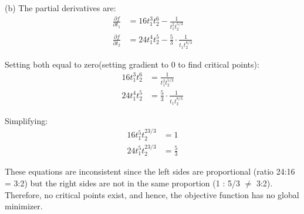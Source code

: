 \documentclass{article}
\begin{document}
(b) The partial derivatives are:
\begin{align*}
\frac{\partial f}{\partial t_1} &= 16t_1^3 t_2^6 - \frac{1}{t_1^2 t_2^{5/3}} \\
\frac{\partial f}{\partial t_2} &= 24t_1^4 t_2^5 - \frac{5}{3} \cdot \frac{1}{t_1 t_2^{8/3}}
\end{align*}

Setting both equal to zero(setting gradient to 0 to find critical points):
\begin{align*}
16t_1^3 t_2^6 &= \frac{1}{t_1^2 t_2^{5/3}} \\
24t_1^4 t_2^5 &= \frac{5}{3} \cdot \frac{1}{t_1 t_2^{8/3}}
\end{align*}

Simplifying:
\begin{align*}
16t_1^5 t_2^{23/3} &= 1 \\
24t_1^5 t_2^{23/3} &= \frac{5}{3}
\end{align*}

These equations are inconsistent since the left sides are proportional (ratio 24:16 = 3:2) but the right sides are not in the same proportion (1 : 5/3 $\neq$ 3:2). \\

Therefore, no critical points exist, and hence, the objective function has no global minimizer.
\end{document}
